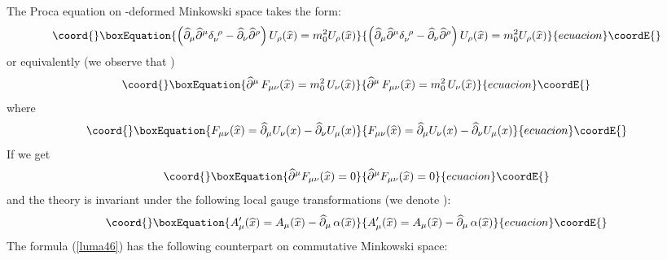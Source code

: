 \documentclass[a4paper,a4paper]{article}
\begin{document}
The Proca equation on \myHighlight{$\kappa$}\coordHE{}-deformed Minkowski space takes the
form:
\begin{equation}\coord{}\boxEquation{\label{luma42}  
  \left( \widehat{\partial}_{\mu} \widehat{\partial}^{\mu}
  \delta_{\nu} ^{\ \rho} -
\widehat{\partial}_{\nu}
\widehat{\partial}^{\rho} \right)
  U_{\rho} ( \widehat{x}) = m^{2}_{0} U_{\rho} ( \widehat{x})
}{\left( \widehat{\partial}_{\mu} \widehat{\partial}^{\mu}
  \delta_{\nu} ^{\ \rho} -
\widehat{\partial}_{\nu}
\widehat{\partial}^{\rho} \right)
  U_{\rho} ( \widehat{x}) = m^{2}_{0} U_{\rho} ( \widehat{x})
}{ecuacion}\coordE{}\end{equation}
or equivalently (we observe that \coordHE{})
\begin{equation}\coord{}\boxEquation{\label{luma43}  
   \widehat{\partial }^{\mu} \, F_{\mu\nu}( \widehat{x}) =
  m^{2}_{0} \, U_{\nu} ( \widehat{x})
}{\widehat{\partial }^{\mu} \, F_{\mu\nu}( \widehat{x}) =
  m^{2}_{0} \, U_{\nu} ( \widehat{x})
}{ecuacion}\coordE{}\end{equation}
where
\begin{equation}\coord{}\boxEquation{\label{luma44}    
  F_{\mu\nu}( \widehat{x}) = \widehat{\partial}_{\mu} U_{\nu} (x)
   - \widehat{\partial}_{\nu} U_{\mu} (x)
}{F_{\mu\nu}( \widehat{x}) = \widehat{\partial}_{\mu} U_{\nu} (x)
   - \widehat{\partial}_{\nu} U_{\mu} (x)
}{ecuacion}\coordE{}\end{equation}
If \coordHE{} we get
\begin{equation}\coord{}\boxEquation{\label{luma45}  
  \widehat{\partial}^{\mu} F_{\mu\nu} ( \widehat{x}) = 0
}{\widehat{\partial}^{\mu} F_{\mu\nu} ( \widehat{x}) = 0
}{ecuacion}\coordE{}\end{equation}
and the theory is invariant under the following local \coordHE{}
gauge transformations (we denote \coordHE{}):
\begin{equation}\coord{}\boxEquation{\label{luma46}  
  A^{\prime}_{\mu} ( \widehat{x}) = A_{\mu} ( \widehat{x}) -
  \widehat{\partial}_{\mu} \, \alpha ( \widehat{x})
}{A^{\prime}_{\mu} ( \widehat{x}) = A_{\mu} ( \widehat{x}) -
  \widehat{\partial}_{\mu} \, \alpha ( \widehat{x})
}{ecuacion}\coordE{}\end{equation}
The formula (\ref{luma46})
 has the following counterpart on commutative
Minkowski space:
\end{document}

